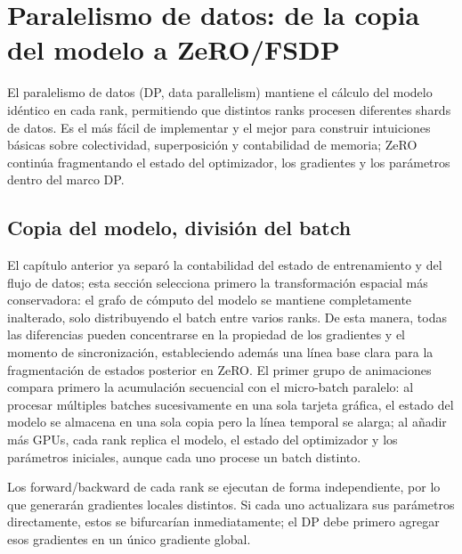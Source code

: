 \section{Paralelismo de datos: de la copia del modelo a ZeRO/FSDP}

El paralelismo de datos (DP, data parallelism) mantiene el cálculo del modelo idéntico en cada rank, permitiendo que distintos ranks procesen diferentes shards de datos. Es el más fácil de implementar y el mejor para construir intuiciones básicas sobre colectividad, superposición y contabilidad de memoria; ZeRO continúa fragmentando el estado del optimizador, los gradientes y los parámetros dentro del marco DP.

\subsection{Copia del modelo, división del batch}

El capítulo anterior ya separó la contabilidad del estado de entrenamiento y del flujo de datos; esta sección selecciona primero la transformación espacial más conservadora: el grafo de cómputo del modelo se mantiene completamente inalterado, solo distribuyendo el batch entre varios ranks. De esta manera, todas las diferencias pueden concentrarse en la propiedad de los gradientes y el momento de sincronización, estableciendo además una línea base clara para la fragmentación de estados posterior en ZeRO. El primer grupo de animaciones compara primero la acumulación secuencial con el micro-batch paralelo: al procesar múltiples batches sucesivamente en una sola tarjeta gráfica, el estado del modelo se almacena en una sola copia pero la línea temporal se alarga; al añadir más GPUs, cada rank replica el modelo, el estado del optimizador y los parámetros iniciales, aunque cada uno procese un batch distinto.



Los forward/backward de cada rank se ejecutan de forma independiente, por lo que generarán gradientes locales distintos. Si cada uno actualizara sus parámetros directamente, estos se bifurcarían inmediatamente; el DP debe primero agregar esos gradientes en un único gradiente global.

